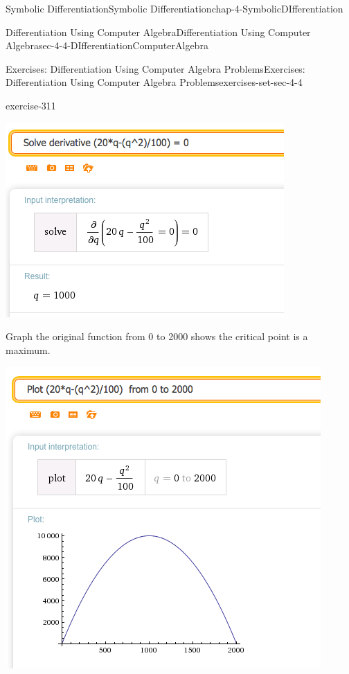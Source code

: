 \documentclass[oneside,10pt,]{book}
\numberwithin{equation}{section}
\begin{document}
\begin{chapterptx}{Symbolic Differentiation}{}{Symbolic Differentiation}{}{}{chap-4-SymbolicDIfferentiation}
\begin{sectionptx}{Differentiation Using Computer Algebra}{}{Differentiation Using Computer Algebra}{}{}{sec-4-4-DIfferentiationComputerAlgebra}
\begin{exercises-subsection-numberless}{Exercises: Differentiation Using Computer Algebra Problems}{}{Exercises: Differentiation Using Computer Algebra Problems}{}{}{exercises-set-sec-4-4}
\begin{divisionexercise}{23}{}{}{exercise-311}
\begin{sidebyside}{1}{0.3}{0.3}{0}
\begin{sbspanel}{0.4}
\includegraphics[width=1\linewidth]{images/sec4-4-sol23a.png}
\end{sbspanel}%
\end{sidebyside}%
\par
\hypertarget{p-1779}{}%
Graph the original function from 0 to 2000 shows the critical point is a maximum.%
\begin{sidebyside}{1}{0.2}{0.2}{0}%
\begin{sbspanel}{0.6}%
\includegraphics[width=1\linewidth]{images/sec4-4-sol23b.png}
\end{sbspanel}%

\end{sidebyside}
\end{divisionexercise}
\end{exercises-subsection-numberless}
\end{sectionptx}
\end{chapterptx}
\end{document}
